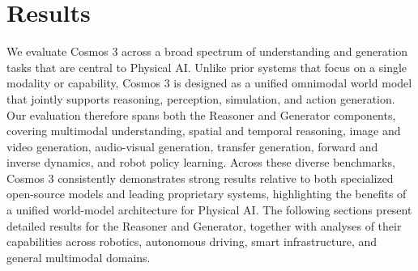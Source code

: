\section{Results}
\label{sec::results}

We evaluate Cosmos 3 across a broad spectrum of understanding and generation tasks that are central to Physical AI. Unlike prior systems that focus on a single modality or capability, Cosmos 3 is designed as a unified omnimodal world model that jointly supports reasoning, perception, simulation, and action generation. Our evaluation therefore spans both the Reasoner and Generator components, covering multimodal understanding, spatial and temporal reasoning, image and video generation, audio-visual generation, transfer generation, forward and inverse dynamics, and robot policy learning. Across these diverse benchmarks, Cosmos 3 consistently demonstrates strong results relative to both specialized open-source models and leading proprietary systems, highlighting the benefits of a unified world-model architecture for Physical AI. The following sections present detailed results for the Reasoner and Generator, together with analyses of their capabilities across robotics, autonomous driving, smart infrastructure, and general multimodal domains. 





